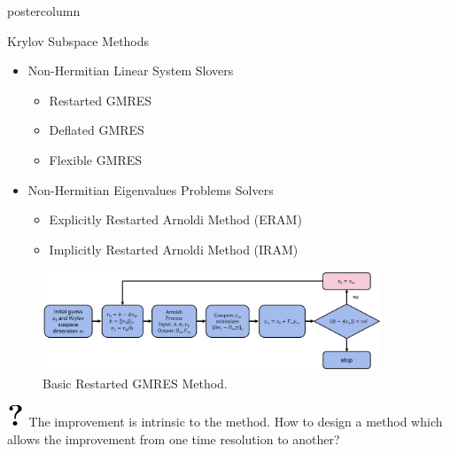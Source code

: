 \documentclass{beamer}
\newcommand{\bigqm}[1][1]{\text{\larger[#1]{\textbf{?}}}}
\begin{document}
\begin{frame}
\begin{columns}
\begin{column}{.33\textwidth}
\begin{beamercolorbox}[center]{postercolumn}
\begin{minipage}{.98\textwidth}
{\begin{myblock}{Krylov Subspace Methods}
              		\begin{itemize}
              			\item Non-Hermitian Linear System Slovers
                		\begin{itemize}
                			\item Restarted GMRES
                			\item Deflated GMRES
                			\item Flexible GMRES
                		\end{itemize}
                		\vspace{0.5em}
              			\item Non-Hermitian Eigenvalues Problems Solvers
                		\begin{itemize}
                			\item Explicitly Restarted Arnoldi Method (ERAM)
                			\item Implicitly Restarted Arnoldi Method (IRAM)
                		\end{itemize}
              		\end{itemize}  
						\vspace{0.5em}
						\begin{figure}
							\begin{minipage}{1.01\textwidth}
								\centering\includegraphics[width=0.9\textwidth]{img/gmres.png}
								\caption{Basic Restarted GMRES Method.}
								\label{fig:stim}
							\end{minipage}
						\end{figure}
						\vspace{0.5em}
						{\color{red}$\bigqm[6]$}
						          \large The improvement is intrinsic to the method.
How to design a method which allows the improvement from one time resolution to another?
					\end{myblock}\vfill
		}\end{minipage}\end{beamercolorbox}
	\end{column}


\end{columns}
\end{frame}
\end{document}
